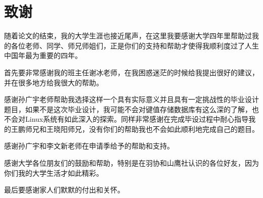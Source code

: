 
\chapter{致谢}
 	随着论文的结束，我的大学生涯也接近尾声，在这里我要感谢大学四年里帮助过我的各位老师、同学、师兄师姐们，正是你们的支持和帮助才使得我顺利度过了人生中国年最为重要的四年。

 	首先要非常感谢我的班主任谢冰老师，在我困惑迷茫的时候给我提出很好的建议，并在很多地方给我很大的帮助。

 	感谢孙广宇老师帮助我选择这样一个具有实际意义并且具有一定挑战性的毕业设计题目，如果不是这次毕业设计，我可能不会对键值存储数据库有这么深的了解，也不会对Linux系统有如此深入的探索。同样非常感谢在完成毕设过程中耐心指导我的王鹏师兄和王晓阳师兄，没有你们的帮助我也不会如此顺利地完成自己的题目。

 	感谢孙广宇和李文新老师在申请季给予的帮助和支持。

 	感谢大学各位朋友们的鼓励和帮助，特别是在羽协和山鹰社认识的各位好友，因为你们我的大学生活才如此精彩。

 	最后要感谢家人们默默的付出和关怀。
